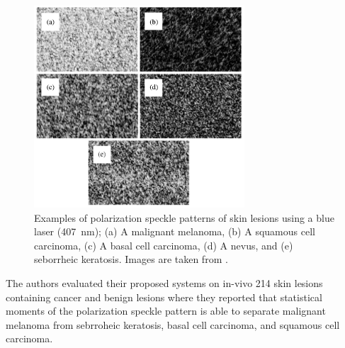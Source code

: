 \begin{figure}
\begin{center}
\includegraphics[width = 0.7\textwidth]{Chapter4/Figures/Tchvialeva-ex1.png}
\caption[Speckle polarimetry images of skin lesions]{Examples of polarization speckle patterns of skin lesions using a blue laser (407~\si{\nano\meter}); (a) A malignant melanoma, (b) A squamous cell carcinoma, (c) A basal cell carcinoma, (d) A nevus, and (e) seborrheic keratosis. Images are taken from \cite{tchvialeva2013polarization}.}
\label{fig:tchvialeva-ex1}
\end{center}
\end{figure}
\noindent The authors evaluated their proposed systems on in-vivo 214 skin lesions containing cancer and benign lesions where they reported that statistical moments of the polarization speckle pattern is able to separate malignant melanoma from sebrroheic keratosis, basal cell carcinoma, and squamous cell carcinoma.

	

